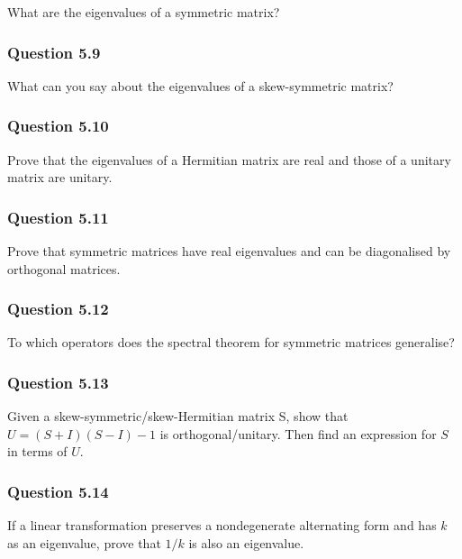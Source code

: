 What are the eigenvalues of a symmetric matrix?

\hypertarget{question-5.9}{%
\subsubsection{Question 5.9}\label{question-5.9}}

What can you say about the eigenvalues of a skew-symmetric matrix?

\hypertarget{question-5.10}{%
\subsubsection{Question 5.10}\label{question-5.10}}

Prove that the eigenvalues of a Hermitian matrix are real and those of a
unitary matrix are unitary.

\hypertarget{question-5.11}{%
\subsubsection{Question 5.11}\label{question-5.11}}

Prove that symmetric matrices have real eigenvalues and can be
diagonalised by orthogonal matrices.

\hypertarget{question-5.12}{%
\subsubsection{Question 5.12}\label{question-5.12}}

To which operators does the spectral theorem for symmetric matrices
generalise?

\hypertarget{question-5.13}{%
\subsubsection{Question 5.13}\label{question-5.13}}

Given a skew-symmetric/skew-Hermitian matrix S, show that
\(U = (S + I)(S - I)-1\) is orthogonal/unitary. Then find an expression
for \(S\) in terms of \(U\).

\hypertarget{question-5.14}{%
\subsubsection{Question 5.14}\label{question-5.14}}

If a linear transformation preserves a nondegenerate alternating form
and has \(k\) as an eigenvalue, prove that \(1/k\) is also an
eigenvalue.

